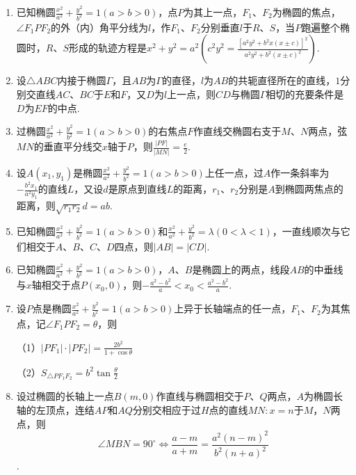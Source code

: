 \documentclass{article}
\begin{document}
\begin{enumerate}[label=\arabic*.]
\item 已知椭圆$\frac{x^2}{a^2} + \frac{y^2}{b^2} = 1 \left(a > b > 0\right)$，点$P$为其上一点，$F_1$、$F_2$为椭圆的焦点，$\angle F_1PF_2$的外（内）角平分线为$l$，作$F_1$、$F_2$分别垂直$l$于$R$、$S$，当$P$跑遍整个椭圆时，$R$、$S$形成的轨迹方程是$x^2+y^2 = a^2
\left(
c^2y^2 = \frac{\left[a^2y^2 + b^2x\left(x\pm c\right) \right]^2}{a^2y^2 + b^2\left(x\pm c\right)^2}
\right)$. 

\item 设$\triangle ABC$内接于椭圆$\Gamma$，且$AB$为$\Gamma$的直径，$l$为$AB$的共轭直径所在的直线，$1$分别交直线$AC$、$BC$于$E$和$F$，又$D$为$l$上一点，则$CD$与椭圆$\Gamma$相切的充要条件是$D$为$EF$的中点. 

\item 过椭圆$\frac{x^2}{a^2} + \frac{y^2}{b^2} = 1 \left(a > b > 0\right)$的右焦点$F$作直线交椭圆右支于$M$、$N$两点，弦$MN$的垂直平分线交$x$轴于$P$，则$\frac{\left|PF\right|}{\left|MN\right|}=\frac{e}{2}$. 

\item 设$A\left(x_1,y_1\right)$是椭圆$\frac{x^2}{a^2} + \frac{y^2}{b^2} = 1 \left(a > b > 0\right)$上任一点，过$A$作一条斜率为$-\frac{b^2x_1}{a^2y_1}$的直线$L$，又设$d$是原点到直线$L$的距离，$r_1$、$r_2$分别是$A$到椭圆两焦点的距离，则$\sqrt{r_1r_2}d=ab$. 

\item 已知椭圆$\frac{x^2}{a^2} + \frac{y^2}{b^2} = 1 \left(a > b > 0\right)$和$\frac{x^2}{a^2} + \frac{y^2}{b^2} = \lambda \left(0 < \lambda < 1\right)$，一直线顺次与它们相交于$A$、$B$、$C$、$D$四点，则$\left|AB \right| = \left|CD \right|$. 

\item 已知椭圆$\frac{x^2}{a^2} + \frac{y^2}{b^2} = 1 \left(a > b > 0\right)$，$A$、$B$是椭圆上的两点，线段$AB$的中垂线与$x$轴相交于点$P(x_0,0)$，则$-\frac{a^2-b^2}{a}<x_0<\frac{a^2-b^2}{a}$. 

\item 设$P$点是椭圆$\frac{x^2}{a^2} + \frac{y^2}{b^2} = 1 \left(a > b > 0\right)$上异于长轴端点的任一点，$F_1$、$F_2$为其焦点，记$\angle F_1PF_2=\theta$，则

（1）$\left|PF_1\right|\cdot \left|PF_2\right|=\frac{2b^2}{1+\cos\theta}$

（2）$S_{\triangle PF_1F_2} = b^2\tan\frac{\theta}{2}$

\item 设过椭圆的长轴上一点$B(m,0)$作直线与椭圆相交于$P$、$Q$两点，$A$为椭圆长轴的左顶点，连结$AP$和$AQ$分别交相应于过$H$点的直线$MN: x=n$于$M$，$N$两点，则$$\angle MBN=90^\circ \Leftrightarrow \frac{a-m}{a+m} = \frac{a^2\left(n-m\right)^2}{b^2\left(n+a\right)^2}$$. 


\end{enumerate}
\end{document}
